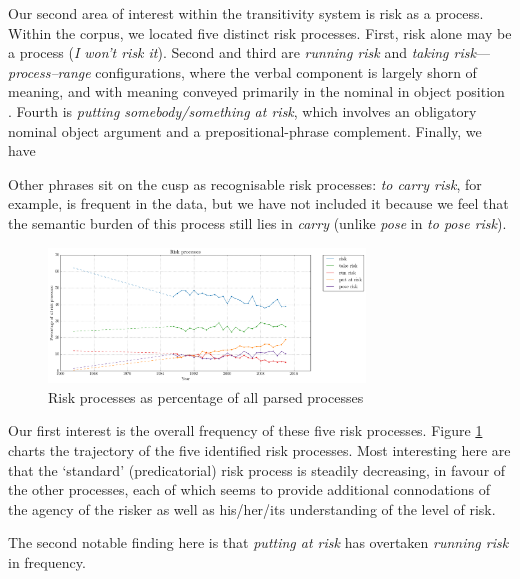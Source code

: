 		Our second area of interest within the transitivity system is risk as a process. Within the corpus, we located five distinct risk processes. First, risk alone may be a process (\emph{I won't risk it}). Second and third are \emph{running risk} and \emph{taking risk}---\emph{process--range} configurations, where the verbal component is largely shorn of meaning, and with meaning conveyed primarily in the nominal in object position \cite{halliday_introduction_2004}. Fourth is \emph{putting somebody/something at risk}, which involves an obligatory nominal object argument and a prepositional-phrase complement. Finally, we have

        Other phrases sit on the cusp as recognisable risk processes: \emph{to carry risk}, for example, is frequent in the data, but we have not included it because we feel that the semantic burden of this process still lies in \emph{carry} (unlike \emph{pose} in \emph{to pose risk}).

			\begin{figure}[htb!]
			\centering
			\includegraphics[width=0.75\textwidth]{../images/risk_processes.png}
			\caption{Risk processes as percentage of all parsed processes}
			\label{fig:riskprocesses}
			\end{figure}
			Our first interest is the overall frequency of these five risk processes. 
            Figure \ref{fig:riskprocesses} charts the trajectory of the five identified risk processes. Most interesting here are that the `standard' (predicatorial) risk process is steadily decreasing, in favour of the other processes, each of which seems to provide additional connodations of the agency of the risker as well as his\slash her\slash its understanding of the level of risk. 

            The second notable finding here is that \emph{putting at risk} has overtaken \emph{running risk} in frequency.

